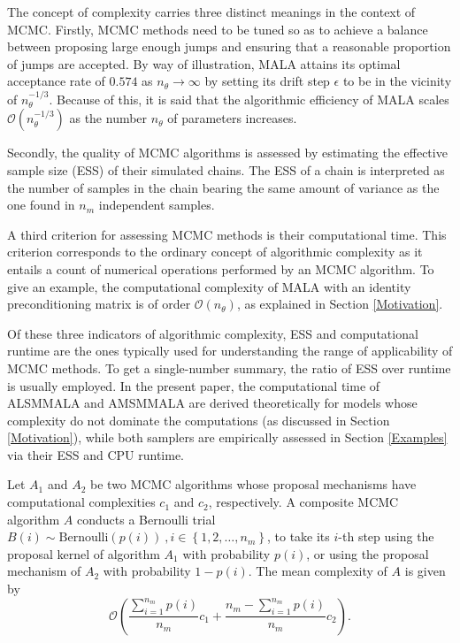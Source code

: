 \documentclass[twoside,11pt]{article}
\begin{document}
The concept of complexity carries three distinct meanings in the context of MCMC. Firstly, MCMC methods need to be tuned so
as to achieve a balance between proposing large enough jumps and ensuring that a reasonable proportion of jumps are accepted.
By way of illustration, MALA attains its optimal acceptance rate of $0.574$ as $n_{\theta}\rightarrow\infty$ by setting its
drift step $\epsilon$ to be in the vicinity of $n_{\theta}^{-1/3}$. Because of this, it is said that the algorithmic
efficiency of MALA scales $\mathcal{O}(n_{\theta}^{-1/3})$ as the number $n_{\theta}$ of parameters increases.

Secondly, the quality of MCMC algorithms is assessed by estimating the effective sample size (ESS) of their simulated chains.
The ESS of a chain is interpreted as the number of samples in the chain bearing the same amount of variance as the one found 
in $n_m$ independent samples.

A third criterion for assessing MCMC methods is their computational time.
This criterion corresponds to the ordinary concept of algorithmic complexity as it entails a count of numerical operations
performed by an MCMC algorithm. To give an example, the computational complexity of MALA with an identity preconditioning
matrix is of order $\mathcal{O}(n_{\theta})$, as explained in Section \ref{Motivation}.

Of these three indicators of algorithmic complexity, ESS and computational runtime are the ones typically used for
understanding the range of applicability of MCMC methods. To get a single-number summary, the ratio of ESS over runtime is
usually employed. In the present paper, the computational time of ALSMMALA and AMSMMALA are derived theoretically for models
whose complexity do not dominate the computations (as discussed in Section \ref{Motivation}), while both samplers are 
empirically assessed in Section \ref{Examples} via their ESS and CPU runtime.

\begin{proposition}
Let $A_1$ and $A_2$ be two MCMC algorithms whose proposal mechanisms have computational complexities $c_1$ and $c_2$, 
respectively. A composite MCMC algorithm $A$ conducts a Bernoulli trial
$B(i)\sim\mbox{Bernoulli}(p(i))~,i\in\left\{1,2,\dots,n_m\right\}$, to take its $i$-th step using the proposal kernel of 
algorithm $A_1$ with probability $p(i)$, or using the proposal mechanism of $A_2$ with probability $1-p(i)$. The mean 
complexity of $A$ is given by
\begin{equation}
\label{eq:c}
\mathcal{O}\left(
\dfrac{\sum_{i=1}^{n_m}p(i)}{n_m}c_1+\dfrac{n_m-\sum_{i=1}^{n_m}p(i)}{n_m}c_2
\right).
\end{equation}
\end{proposition}
\end{document}
